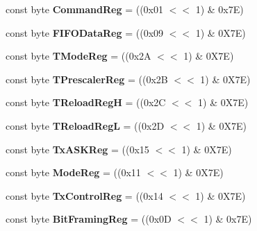\begin{DoxyCompactItemize}
\item 
const byte {\bfseries Command\+Reg} = ((0x01 $<$$<$ 1) \& 0x7\+E)\hypertarget{classmfrc522_abc418205b4d996c1541bfda1ce89c196}{}\label{classmfrc522_abc418205b4d996c1541bfda1ce89c196}

\item 
const byte {\bfseries F\+I\+F\+O\+Data\+Reg} = ((0x09 $<$$<$ 1) \& 0\+X7\+E)\hypertarget{classmfrc522_aa1dd9bd0fb405bc8217cc6c655c0b434}{}\label{classmfrc522_aa1dd9bd0fb405bc8217cc6c655c0b434}

\item 
const byte {\bfseries T\+Mode\+Reg} = ((0x2\+A $<$$<$ 1) \& 0\+X7\+E)\hypertarget{classmfrc522_ab4ce527983527c3db68f7541cb6b62fc}{}\label{classmfrc522_ab4ce527983527c3db68f7541cb6b62fc}

\item 
const byte {\bfseries T\+Prescaler\+Reg} = ((0x2\+B $<$$<$ 1) \& 0\+X7\+E)\hypertarget{classmfrc522_a1b54b9b1e82ebc217c280928d1f567f1}{}\label{classmfrc522_a1b54b9b1e82ebc217c280928d1f567f1}

\item 
const byte {\bfseries T\+Reload\+RegH} = ((0x2\+C $<$$<$ 1) \& 0\+X7\+E)\hypertarget{classmfrc522_a491eb14159868a7aaf5c0d23ea5679f5}{}\label{classmfrc522_a491eb14159868a7aaf5c0d23ea5679f5}

\item 
const byte {\bfseries T\+Reload\+RegL} = ((0x2\+D $<$$<$ 1) \& 0\+X7\+E)\hypertarget{classmfrc522_a1bfa3adaddcb782565d871c0efed53d1}{}\label{classmfrc522_a1bfa3adaddcb782565d871c0efed53d1}

\item 
const byte {\bfseries Tx\+A\+S\+K\+Reg} = ((0x15 $<$$<$ 1) \& 0\+X7\+E)\hypertarget{classmfrc522_a365974a47e52e69d7008df3b37019ecd}{}\label{classmfrc522_a365974a47e52e69d7008df3b37019ecd}

\item 
const byte {\bfseries Mode\+Reg} = ((0x11 $<$$<$ 1) \& 0\+X7\+E)\hypertarget{classmfrc522_a89d0eb6565c3c0c37dfde546f4cab24f}{}\label{classmfrc522_a89d0eb6565c3c0c37dfde546f4cab24f}

\item 
const byte {\bfseries Tx\+Control\+Reg} = ((0x14 $<$$<$ 1) \& 0\+X7\+E)\hypertarget{classmfrc522_a50e31c19c5289374ea3f8e397b30ae5a}{}\label{classmfrc522_a50e31c19c5289374ea3f8e397b30ae5a}

\item 
const byte {\bfseries Bit\+Framing\+Reg} = ((0x0\+D $<$$<$ 1) \& 0x7\+E)\hypertarget{classmfrc522_a1147f52a011b9cf58a3bfe39886bfa55}{}\label{classmfrc522_a1147f52a011b9cf58a3bfe39886bfa55}


\end{DoxyCompactItemize}
